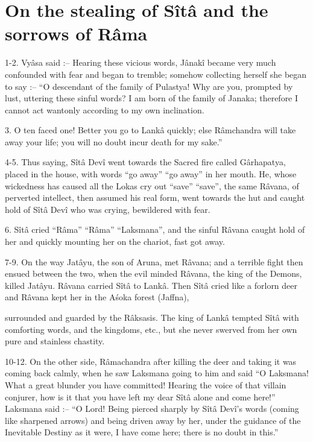 ﻿\chapter{On the stealing of S\^it\^a and the sorrows of R\^ama}

1-2. Vy\^asa said :-- Hearing these vicious words, J\^anak\^i became very much confounded with fear and began to tremble; somehow collecting herself she began to say :-- ``O descendant of the family of Pulastya! Why are you, prompted by lust, uttering these sinful words? I am born of the family of Janaka; therefore I cannot act wantonly according to my own inclination.

3. O ten faced one! Better you go to Lank\^a quickly; else R\^amchandra will take away your life; you will no doubt incur death for my sake.''

4-5. Thus saying, S\^it\^a Dev\^i went towards the Sacred fire called G\^arhapatya, placed in the house, with words ``go away'' ``go away'' in her mouth. He, whose wickedness has caused all the Lokas cry out ``save'' ``save'', the same R\^avana, of perverted intellect, then assumed his real form, went towards the hut and caught hold of S\^it\^a Dev\^i who was crying, bewildered with fear.

6. S\^it\^a cried ``R\^ama'' ``R\^ama'' ``Laksmana'', and the sinful R\^avana caught hold of her and quickly mounting her on the chariot, fast got away.

7-9. On the way Jat\^ayu, the son of Aruna, met R\^avana; and a terrible fight then ensued between the two, when the evil minded R\^avana, the king of the Demons, killed Jat\^ayu. R\^avana carried S\^it\^a to Lank\^a. Then S\^it\^a cried like a forlorn deer and R\^avana kept her in the A\'soka forest (Jaffna),

surrounded and guarded by the R\^aksasis. The king of Lank\^a tempted S\^it\^a with comforting words, and the kingdoms, etc., but she never swerved from her own pure and stainless chastity.

10-12. On the other side, R\^amachandra after killing the deer and taking it was coming back calmly, when he saw Laksmana going to him and said ``O Laksmana! What a great blunder you have committed! Hearing the voice of that villain conjurer, how is it that you have left my dear S\^it\^a alone and come here!'' Laksmana said :-- ``O Lord! Being pierced sharply by S\^it\^a Dev\^i's words (coming like sharpened arrows) and being driven away by her, under the guidance of the Inevitable Destiny as it were, I have come here; there is no doubt in this.''


